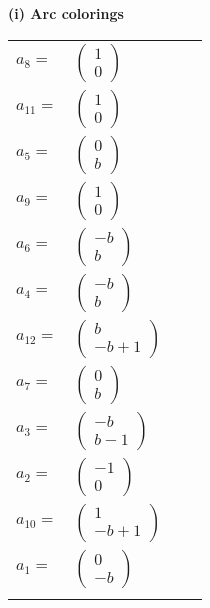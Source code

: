 \documentclass[1p]{elsarticle_modified}
\theoremstyle{definition}
\begin{document}
\flushleft \textbf{(i) Arc colorings}\\
\begin{tabular}{m{7pt} m{180pt} m{7pt} m{180pt} }
\flushright $a_{8}=$&$\begin{pmatrix}1\\0\end{pmatrix}$ \\
\flushright $a_{11}=$&$\begin{pmatrix}1\\0\end{pmatrix}$ \\
\flushright $a_{5}=$&$\begin{pmatrix}0\\b\end{pmatrix}$ \\
\flushright $a_{9}=$&$\begin{pmatrix}1\\0\end{pmatrix}$ \\
\flushright $a_{6}=$&$\begin{pmatrix}- b\\b\end{pmatrix}$ \\
\flushright $a_{4}=$&$\begin{pmatrix}- b\\b\end{pmatrix}$ \\
\flushright $a_{12}=$&$\begin{pmatrix}b\\- b+1\end{pmatrix}$ \\
\flushright $a_{7}=$&$\begin{pmatrix}0\\b\end{pmatrix}$ \\
\flushright $a_{3}=$&$\begin{pmatrix}- b\\b-1\end{pmatrix}$ \\
\flushright $a_{2}=$&$\begin{pmatrix}-1\\0\end{pmatrix}$ \\
\flushright $a_{10}=$&$\begin{pmatrix}1\\- b+1\end{pmatrix}$ \\
\flushright $a_{1}=$&$\begin{pmatrix}0\\- b\end{pmatrix}$\\&\end{tabular}
\end{document}
